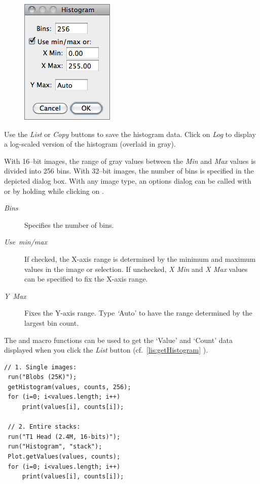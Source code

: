 \begin{figure}%
\vspace*{-12pt}
\includegraphics[scale=0.55]{images/HistogramDialog}\end{figure}%
Use the \emph{List} or \emph{Copy} buttons to save the histogram
data. Click on \emph{Log} to display a log-scaled version of the histogram
(overlaid in gray).

With 16--bit images, the range of gray values between the \emph{Min}
and \emph{Max} values is divided into 256 bins. With 32--bit images,
the number of bins is specified in the depicted dialog box. With any
image type, an options dialog can be called with 
 or by holding  while clicking on
.
\begin{description}
\item [{\emph{Bins}}] Specifies the number of bins.
\end{description}
\clearpage{}
\begin{description}
\item [{\emph{Use\ min/max}}] If checked, the X-axis range is determined
by the minimum and maximum values in the image or selection. If unchecked,
\emph{X Min} and\emph{ X Max} values can be specified to fix the X-axis
range. 
\item [{\emph{Y\ Max}}] Fixes the Y-axis range. Type \emph{`}Auto' to
have the range determined by the largest bin count.
\end{description}
The  and  macro functions
can be used to get the `Value' and `Count' data displayed when
you click the \emph{List} button (cf.\ \eqref{lis:getHistogram}
).

\begin{lstlisting}[caption={[Obtaining Histogram Lists]Obtaining Histogram Lists},label={lis:getHistogram},showstringspaces=false,tabsize=4]
 // 1. Single images: 
 run("Blobs (25K)"); 
 getHistogram(values, counts, 256); 
 for (i=0; i<values.length; i++)
     print(values[i], counts[i]);

 // 2. Entire stacks:
 run("T1 Head (2.4M, 16-bits)");
 run("Histogram", "stack");
 Plot.getValues(values, counts);
 for (i=0; i<values.length; i++)
     print(values[i], counts[i]);
\end{lstlisting}




